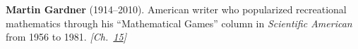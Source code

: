 \textbf{Martin Gardner} (1914–2010). American writer who popularized recreational mathematics through his ``Mathematical Games'' column in \emph{Scientific American} from 1956 to 1981. \emph{[Ch.~\hyperref[ch:envelopeparadox]{15}]}

